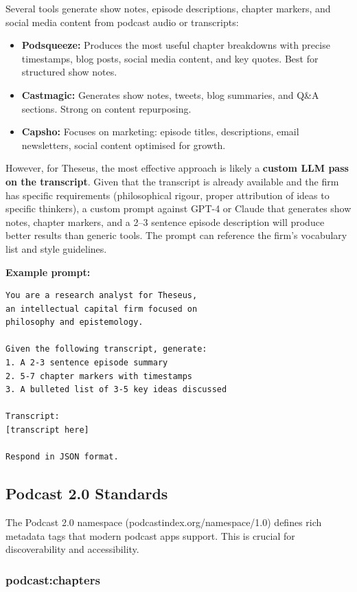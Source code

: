 \documentclass[11pt,letterpaper]{article}
\begin{document}
Several tools generate show notes, episode descriptions, chapter markers, and social media content from podcast audio or transcripts:

\begin{itemize}
  \item \textbf{Podsqueeze:} Produces the most useful chapter breakdowns with precise timestamps, blog posts, social media content, and key quotes. Best for structured show notes.
  \item \textbf{Castmagic:} Generates show notes, tweets, blog summaries, and Q\&A sections. Strong on content repurposing.
  \item \textbf{Capsho:} Focuses on marketing: episode titles, descriptions, email newsletters, social content optimised for growth.
\end{itemize}

However, for Theseus, the most effective approach is likely a \textbf{custom LLM pass on the transcript}. Given that the transcript is already available and the firm has specific requirements (philosophical rigour, proper attribution of ideas to specific thinkers), a custom prompt against GPT-4 or Claude that generates show notes, chapter markers, and a 2–3 sentence episode description will produce better results than generic tools. The prompt can reference the firm's vocabulary list and style guidelines.

\textbf{Example prompt:}

\begin{verbatim}
You are a research analyst for Theseus,
an intellectual capital firm focused on
philosophy and epistemology.

Given the following transcript, generate:
1. A 2-3 sentence episode summary
2. 5-7 chapter markers with timestamps
3. A bulleted list of 3-5 key ideas discussed

Transcript:
[transcript here]

Respond in JSON format.
\end{verbatim}

\subsection{Podcast 2.0 Standards}

The Podcast 2.0 namespace (podcastindex.org/namespace/1.0) defines rich metadata tags that modern podcast apps support. This is crucial for discoverability and accessibility.

\subsubsection{podcast:chapters}
\end{document}
